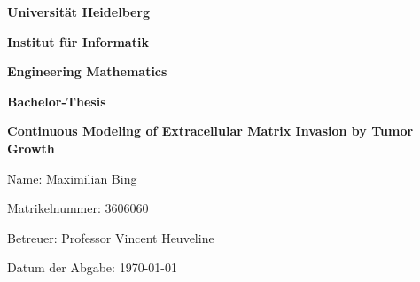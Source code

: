 \begin{titlepage}
    \begin{center}
	{\Huge\textbf{Universität Heidelberg}\par}
    {\Huge\textbf{Institut für Informatik} \par}
    {\Huge\textbf{Engineering Mathematics}\par}
	\vspace{3cm}
	{\Large\textbf{Bachelor-Thesis}\par}
    \vspace{1cm}
	{\Huge\bfseries Continuous Modeling of Extracellular Matrix Invasion by Tumor Growth  \par}
    \end{center}
    \vspace{6cm}
	
    \raggedright{\Large Name: Maximilian Bing\par}
    {\Large Matrikelnummer: 3606060\par}
    {\Large Betreuer: Professor Vincent Heuveline\par}
    {\Large Datum der Abgabe: \today\par}
\end{titlepage}
